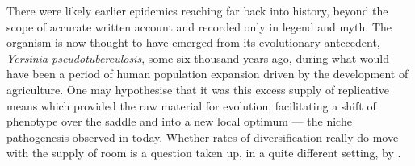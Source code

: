 There were likely earlier \yp{} epidemics reaching far back into history,
beyond the scope of accurate written account and recorded only in legend and
myth. The organism is now thought to have emerged from its evolutionary
antecedent, \textit{Yersinia pseudotuberculosis}, some six thousand years ago,
during what would have been a period of human population expansion driven by
the development of agriculture. One may hypothesise that it was this excess
supply of replicative means which provided the raw material for evolution,
facilitating a shift of phenotype over the saddle and into a new local optimum
--- the niche pathogenesis observed in \yp{} today. Whether rates of
diversification really do move with the supply of room is a question taken up,
in a quite different setting, by .

